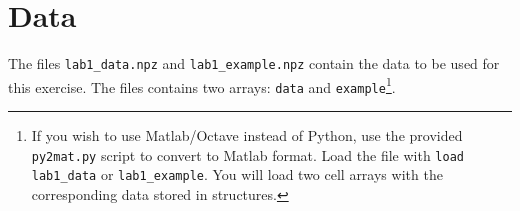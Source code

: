 \documentclass{nada-ten}
\begin{document}


\section{Data}
The files \verb|lab1_data.npz| and \verb|lab1_example.npz| contain the data to be used for this exercise.
The files contains two arrays: \texttt{data} and \texttt{example}\footnote{If you wish to use Matlab/Octave instead of Python, use the provided \texttt{py2mat.py} script to convert to Matlab format. Load the file with \texttt{load lab1\_data} or \texttt{lab1\_example}. You will load two cell arrays with the corresponding data stored in structures.}.
\end{document}
